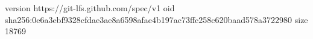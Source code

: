 version https://git-lfs.github.com/spec/v1
oid sha256:0e6a3ebf9328cfdae3ae8a6598afae4b197ac73ffc258c620baad578a3722980
size 18769

